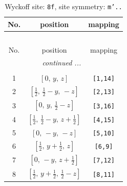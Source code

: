 \documentclass[fleqn,8pt]{jsarticle}
\begin{document}
\begin{longtable}{ccc}
\caption{Wyckoff site: {\tt 8f}, site symmetry: {\tt m'..}}
 \\
 \hline \hline
No. & position & mapping \\ \hline \endfirsthead

\multicolumn{2}{l}{\tablename\ \thetable{}} \\
 \hline \hline
No. & position & mapping \\ \hline \endhead

 \hline \hline
\multicolumn{2}{r}{\footnotesize\it continued ...} \\ \endfoot

 \hline \hline
\multicolumn{2}{r}{} \\ \endlastfoot

1 & $\left[ 0,\, y,\, z \right]$ & {\tt [1,14]} \\ \hline
2 & $\left[ \frac{1}{2},\, \frac{1}{2} - y,\, - z \right]$ & {\tt [2,13]} \\ \hline
3 & $\left[ 0,\, y,\, \frac{1}{2} - z \right]$ & {\tt [3,16]} \\ \hline
4 & $\left[ \frac{1}{2},\, \frac{1}{2} - y,\, z + \frac{1}{2} \right]$ & {\tt [4,15]} \\ \hline
5 & $\left[ 0,\, - y,\, - z \right]$ & {\tt [5,10]} \\ \hline
6 & $\left[ \frac{1}{2},\, y + \frac{1}{2},\, z \right]$ & {\tt [6,9]} \\ \hline
7 & $\left[ 0,\, - y,\, z + \frac{1}{2} \right]$ & {\tt [7,12]} \\ \hline
8 & $\left[ \frac{1}{2},\, y + \frac{1}{2},\, \frac{1}{2} - z \right]$ & {\tt [8,11]} \\
\end{longtable}
\renewcommand{\arraystretch}{1.2}
\end{document}
